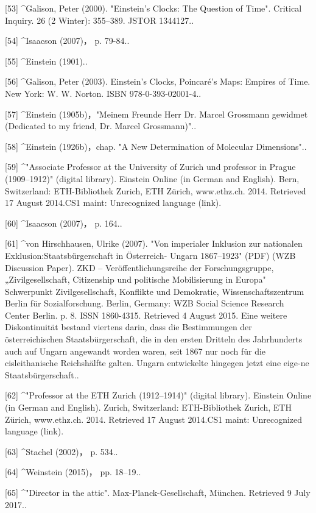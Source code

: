 [53]
^Galison, Peter (2000). "Einstein's Clocks: The Question of Time". Critical Inquiry. 26 (2 Winter): 355–389. JSTOR 1344127..

[54]
^Isaacson (2007)， p. 79-84..

[55]
^Einstein (1901)..

[56]
^Galison, Peter (2003). Einstein's Clocks, Poincaré's Maps: Empires of Time. New York: W. W. Norton. ISBN 978-0-393-02001-4..

[57]
^Einstein (1905b)，"Meinem Freunde Herr Dr. Marcel Grossmann gewidmet (Dedicated to my friend, Dr. Marcel Grossmann)"..

[58]
^Einstein (1926b)，chap. "A New Determination of Molecular Dimensions"..

[59]
^"Associate Professor at the University of Zurich und professor in Prague (1909–1912)" (digital library). Einstein Online (in German and English). Bern, Switzerland: ETH-Bibliothek Zurich, ETH Zürich, www.ethz.ch. 2014. Retrieved 17 August 2014.CS1 maint: Unrecognized language (link).

[60]
^Isaacson (2007)， p. 164..

[61]
^von Hirschhausen, Ulrike (2007). "Von imperialer Inklusion zur nationalen Exklusion:Staatsbürgerschaft in Österreich- Ungarn 1867–1923" (PDF) (WZB Discussion Paper). ZKD – Veröffentlichungsreihe der Forschungsgruppe, „Zivilgesellschaft, Citizenship und politische Mobilisierung in Europa" Schwerpunkt Zivilgesellschaft, Konflikte und Demokratie, Wissenschaftszentrum Berlin für Sozialforschung. Berlin, Germany: WZB Social Science Research Center Berlin. p. 8. ISSN 1860-4315. Retrieved 4 August 2015. Eine weitere Diskontinuität bestand viertens darin, dass die Bestimmungen der österreichischen Staatsbürgerschaft, die in den ersten Dritteln des Jahrhunderts auch auf Ungarn angewandt worden waren, seit 1867 nur noch für die cisleithanische Reichshälfte galten. Ungarn entwickelte hingegen jetzt eine eige-ne Staatsbürgerschaft..

[62]
^"Professor at the ETH Zurich (1912–1914)" (digital library). Einstein Online (in German and English). Zurich, Switzerland: ETH-Bibliothek Zurich, ETH Zürich, www.ethz.ch. 2014. Retrieved 17 August 2014.CS1 maint: Unrecognized language (link).

[63]
^Stachel (2002)， p. 534..

[64]
^Weinstein (2015)， pp. 18–19..

[65]
^"Director in the attic". Max-Planck-Gesellschaft, München. Retrieved 9 July 2017..

